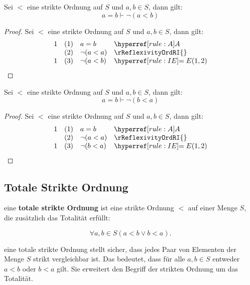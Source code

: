 \documentclass[main.tex]{subfiles}
\begin{document}
\label{aEqualsbImpnLpaLneqbRp}
\begin{theorem}[\(a=b\vdash \neg(a<b)\)]
Sei \(<\) eine strikte Ordnung auf \(S\) und \(a,b\in  S\), dann gilt:
\[a=b\vdash \neg(a<b)\]
\end{theorem}
\begin{proof}
    Sei \(<\) eine strikte Ordnung auf \(S\) und \(a,b\in  S\), dann gilt:
	\[
	\begin{array}{llll}
		1   & (1) & a=b & \rA\\
            & (2) & \neg(a<a) & \rReflexivityOrdRI{}\\
		1   & (3) & \neg(a<b) & \rIE{1,2}\\
	\end{array}
	\]
\end{proof}

\label{aEqualsbImpnLpbLneqaRp}
\begin{theorem}[\(a=b\vdash \neg(b<a)\)]
Sei \(<\) eine strikte Ordnung auf \(S\) und \(a,b\in  S\), dann gilt:
\[a=b\vdash \neg(b<a)\]
\end{theorem}
\begin{proof}
    Sei \(<\) eine strikte Ordnung auf \(S\) und \(a,b\in  S\), dann gilt:
	\[
	\begin{array}{llll}
		1   & (1) & a=b & \rA\\
            & (2) & \neg(a<a) & \rReflexivityOrdRI{}\\
		1   & (3) & \neg(b<a) & \rIE{1,2}\\
	\end{array}
	\]
\end{proof}

\subsection{Totale Strikte Ordnung}

\begin{definition}
    eine \textbf{totale strikte Ordnung} ist eine strikte Ordnung \(<\) auf einer Menge \(S\), die zusätzlich das Totalität erfüllt:
    
    \[
    \forall a, b \in S (a < b \lor b < a).
    \]
\end{definition}

\begin{remark}
    eine totale strikte Ordnung stellt sicher, dass jedes Paar von Elementen der Menge \(S\) strikt vergleichbar ist. Das bedeutet, dass für alle \(a, b \in S\) entweder \(a < b\) oder \(b < a\) gilt. Sie erweitert den Begriff der strikten Ordnung um das Totalität.
\end{remark}
\end{document}
